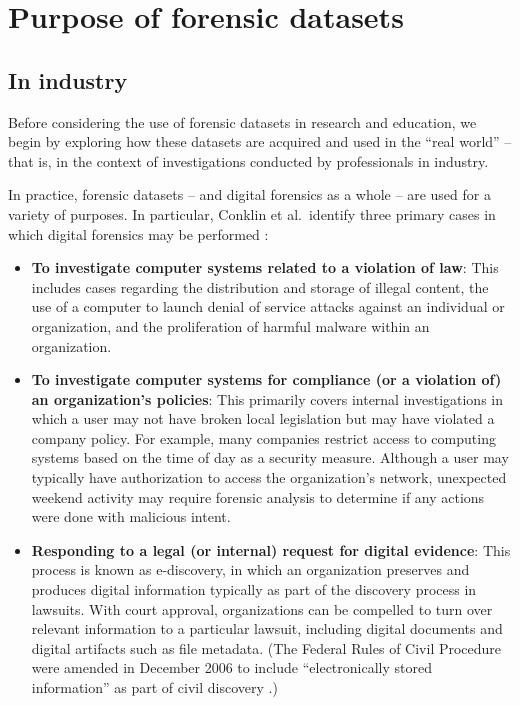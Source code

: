 \documentclass[letterpaper,12pt]{report}
\def\tightlist{}
\begin{document}
\section{Purpose of forensic
datasets}\label{purpose-of-forensic-datasets}

\subsection{In industry}\label{in-industry}

Before considering the use of forensic datasets in research and
education, we begin by exploring how these datasets are acquired and
used in the ``real world'' -- that is, in the context of investigations
conducted by professionals in industry.

In practice, forensic datasets -- and digital forensics as a whole --
are used for a variety of purposes. In particular, Conklin et
al.~identify three primary cases in which digital forensics may be
performed \cite{conklinComputerForensics2022}:

\begin{itemize}
\tightlist
\item
  \textbf{To investigate computer systems related to a violation of
  law}: This includes cases regarding the distribution and storage of
  illegal content, the use of a computer to launch denial of service
  attacks against an individual or organization, and the proliferation
  of harmful malware within an organization.
\item
  \textbf{To investigate computer systems for compliance (or a violation
  of) an organization's policies}: This primarily covers internal
  investigations in which a user may not have broken local legislation
  but may have violated a company policy. For example, many companies
  restrict access to computing systems based on the time of day as a
  security measure. Although a user may typically have authorization to
  access the organization's network, unexpected weekend activity may
  require forensic analysis to determine if any actions were done with
  malicious intent.
\item
  \textbf{Responding to a legal (or internal) request for digital
  evidence}: This process is known as e-discovery, in which an
  organization preserves and produces digital information typically as
  part of the discovery process in lawsuits. With court approval,
  organizations can be compelled to turn over relevant information to a
  particular lawsuit, including digital documents and digital artifacts
  such as file metadata. (The Federal Rules of Civil Procedure were
  amended in December 2006 to include ``electronically stored
  information'' as part of civil discovery
  \cite{withersj.ElectronicallyStoredInformation2006}.)
\end{itemize}
\end{document}
